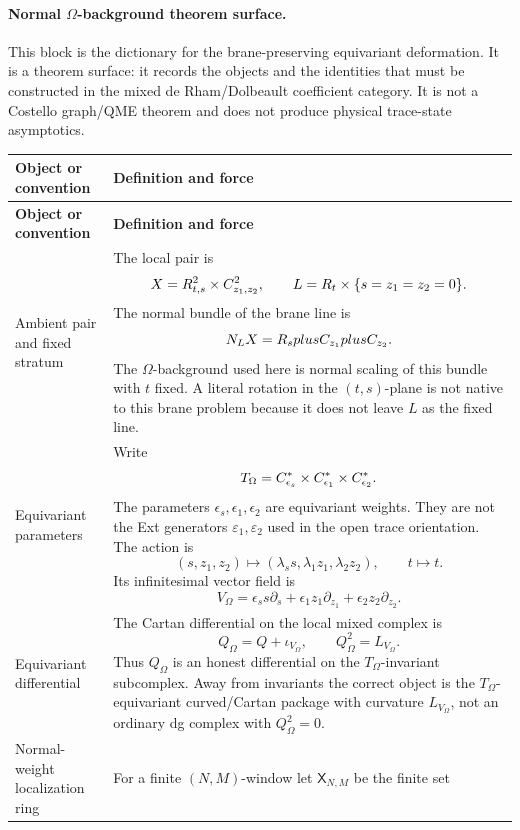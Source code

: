\paragraph{Normal \(\Omega\)-background theorem surface.}
This block is the dictionary for the brane-preserving equivariant
deformation.  It is a theorem surface: it records the objects and the
identities that must be constructed in the mixed de Rham/Dolbeault
coefficient category.  It is not a Costello graph/QME theorem and does
not produce physical trace-state asymptotics.
\begin{longtable}{@{}>{\raggedright\arraybackslash}p{}
  >{\raggedright\arraybackslash}p{}@{}}
\hline
\textbf{Object or convention} & \textbf{Definition and force}\\
\hline
\endfirsthead
\hline
\textbf{Object or convention} & \textbf{Definition and force}\\
\hline
\endhead
Ambient pair and fixed stratum &
The local pair is
\[
  X=R^2_{t,s}\times C^2_{z_1,z_2},\qquad
  L=R_t\times\{s=z_1=z_2=0\}.
\]
The normal bundle of the brane line is
\[
  N_LX=R_splusC_{z_1}plusC_{z_2}.
\]
The \(\Omega\)-background used here is normal scaling of this bundle with
\(t\) fixed.  A literal rotation in the \((t,s)\)-plane is not native to
this brane problem because it does not leave \(L\) as the fixed line.\\
\hline
Equivariant parameters &
Write
\[
  T_\Omega
  =C^*_{\epsilon_s}\times
   C^*_{\epsilon_1}\times
   C^*_{\epsilon_2}.
\]
The parameters \(\epsilon_s,\epsilon_1,\epsilon_2\) are equivariant
weights.  They are not the Ext generators
\(\varepsilon_1,\varepsilon_2\) used in the open trace orientation.
The action is
\[
  (s,z_1,z_2)\mapsto
  (\lambda_s s,\lambda_1z_1,\lambda_2z_2),
  \qquad t\mapsto t .
\]
Its infinitesimal vector field is
\[
  V_\Omega
  =
  \epsilon_s s\partial_s
  +\epsilon_1 z_1\partial_{z_1}
  +\epsilon_2 z_2\partial_{z_2}.
\]\\
\hline
Equivariant differential &
The Cartan differential on the local mixed complex is
\[
  Q_\Omega=Q+\iota_{V_\Omega},\qquad
  Q_\Omega^2=L_{V_\Omega}.
\]
Thus \(Q_\Omega\) is an honest differential on the
\(T_\Omega\)-invariant subcomplex.  Away from invariants the correct
object is the \(T_\Omega\)-equivariant curved/Cartan package with
curvature \(L_{V_\Omega}\), not an ordinary dg complex with
\(Q_\Omega^2=0\).\\
\hline
Normal-weight localization ring &
For a finite \((N,M)\)-window let \(\mathsf X_{N,M}\) be the finite set

\end{longtable}
